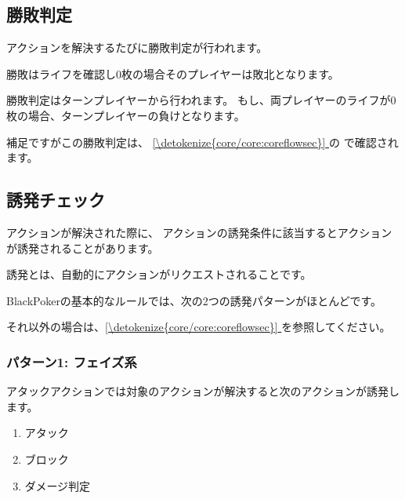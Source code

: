 \documentclass[letterpaper,10pt,dvipdfmx]{sphinxmanual}
\begin{document}
\subsection{勝敗判定}
\label{\detokenize{common/common:id34}}
\sphinxAtStartPar
アクションを解決するたびに勝敗判定が行われます。

\sphinxAtStartPar
勝敗はライフを確認し0枚の場合そのプレイヤーは敗北となります。

\sphinxAtStartPar
勝敗判定はターンプレイヤーから行われます。
もし、両プレイヤーのライフが0枚の場合、ターンプレイヤーの負けとなります。

\sphinxAtStartPar
補足ですがこの勝敗判定は、 \hyperref[\detokenize{core/core:coreflowsec}]{\ref{\detokenize{core/core:coreflowsec}} } の {\hyperref[\detokenize{core/core:winlose}]{}} で確認されます。


\subsection{誘発チェック}
\label{\detokenize{common/common:id35}}
\sphinxAtStartPar
アクションが解決された際に、
アクションの誘発条件に該当するとアクションが誘発されることがあります。

\sphinxAtStartPar
誘発とは、自動的にアクションがリクエストされることです。

\sphinxAtStartPar
BlackPokerの基本的なルールでは、次の2つの誘発パターンがほとんどです。

\sphinxAtStartPar
それ以外の場合は、\hyperref[\detokenize{core/core:coreflowsec}]{\ref{\detokenize{core/core:coreflowsec}} } を参照してください。


\subsubsection{パターン1: フェイズ系}
\label{\detokenize{common/common:id36}}
\sphinxAtStartPar
アタックアクションでは対象のアクションが解決すると次のアクションが誘発します。
\begin{enumerate}
%
\item {} 
\sphinxAtStartPar
アタック

\item {} 
\sphinxAtStartPar
ブロック

\item {} 
\sphinxAtStartPar
ダメージ判定

\end{enumerate}
\end{document}
